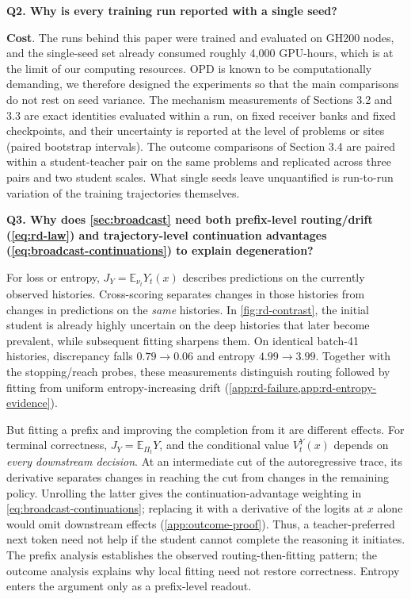 \noindent\textbf{Q2. Why is every training run reported with a single seed?}

\textbf{Cost}. The runs behind this paper were trained and evaluated on GH200 nodes, and the single-seed set already consumed roughly 4{,}000 GPU-hours, which is at the limit of our computing resources. OPD is known to be computationally demanding, we therefore designed the experiments so that the main comparisons do not rest on seed variance. The mechanism measurements of Sections 3.2 and 3.3 are exact identities evaluated within a run, on fixed receiver banks and fixed checkpoints, and their uncertainty is reported at the level of problems or sites (paired bootstrap intervals). The outcome comparisons of Section 3.4 are paired within a student-teacher pair on the same problems and replicated across three pairs and two student scales. What single seeds leave unquantified is run-to-run variation of the training trajectories themselves.

\noindent\textbf{Q3. Why does \cref{sec:broadcast} need both prefix-level routing/drift (\cref{eq:rd-law}) and trajectory-level continuation advantages (\cref{eq:broadcast-continuations}) to explain degeneration?}
\par\noindent
For loss or entropy, $J_Y=\mathbb{E}_{\nu_t}Y_t(x)$ describes predictions on the currently observed histories. Cross-scoring separates changes in those histories from changes in predictions on the \emph{same} histories. In \cref{fig:rd-contrast}, the initial student is already highly uncertain on the deep histories that later become prevalent, while subsequent fitting sharpens them. On identical batch-41 histories, discrepancy falls $0.79\to0.06$ and entropy $4.99\to3.99$. Together with the stopping/reach probes, these measurements distinguish routing followed by fitting from uniform entropy-increasing drift (\cref{app:rd-failure,app:rd-entropy-evidence}).

But fitting a prefix and improving the completion from it are different effects. For terminal correctness, $J_Y=\mathbb{E}_{\Pi_t}Y$, and the conditional value $V_t^Y(x)$ depends on \emph{every downstream decision}. At an intermediate cut of the autoregressive trace, its derivative separates changes in reaching the cut from changes in the remaining policy. Unrolling the latter gives the continuation-advantage weighting in \cref{eq:broadcast-continuations}; replacing it with a derivative of the logits at $x$ alone would omit downstream effects (\cref{app:outcome-proof}). Thus, a teacher-preferred next token need not help if the student cannot complete the reasoning it initiates. The prefix analysis establishes the observed routing-then-fitting pattern; the outcome analysis explains why local fitting need not restore correctness. Entropy enters the argument only as a prefix-level readout.

